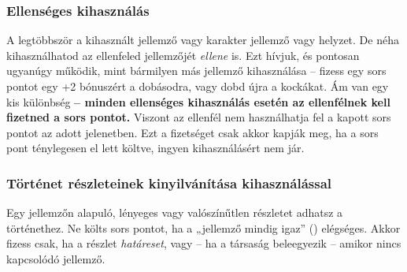 \subsubsection{Ellenséges kihasználás}

A legtöbbször a kihasznált jellemző vagy karakter jellemző vagy helyzet. De néha kihasználhatod az ellenfeled jellemzőjét \emph{ellene} is. Ezt  hívjuk, és pontosan ugyanúgy működik, mint bármilyen más jellemző kihasználása – fizess egy sors pontot egy +2 bónuszért a dobásodra, vagy dobd újra a kockákat. Ám van egy kis különbség \textbf{– minden ellenséges kihasználás esetén az ellenfélnek kell fizetned a sors pontot.} Viszont az ellenfél nem használhatja fel a kapott sors pontot az adott jelenetben. Ezt a fizetséget csak akkor kapják meg, ha a sors pont ténylegesen el lett költve, ingyen kihasználásért nem jár.

\subsubsection{Történet részleteinek kinyilvánítása kihasználással}

Egy jellemzőn alapuló, lényeges vagy valószínűtlen részletet adhatsz a történethez. Ne költs sors pontot, ha a „jellemző mindig igaz” () elégséges. Akkor fizess csak, ha a részlet \emph{határeset}, vagy – ha a társaság beleegyezik – amikor nincs kapcsolódó jellemző.
